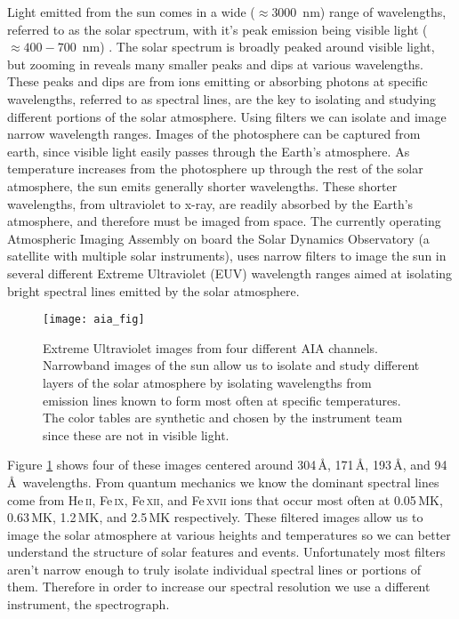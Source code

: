 
Light emitted from the sun comes in a wide ($\approx3000$\, nm) range of wavelengths, referred to as the solar spectrum, with it's peak emission being visible light ($\approx400-700$\, nm) \citep{JudgeBook}.
The solar spectrum is broadly peaked around visible light, but zooming in reveals many smaller peaks and dips at various wavelengths. 
These peaks and dips are from ions emitting or absorbing photons at specific wavelengths, referred to as spectral lines, are the key to isolating and studying different portions of the solar atmosphere.
Using filters we can isolate and image narrow wavelength ranges.
Images of the photosphere can be captured from earth, since visible light easily passes through the Earth's atmosphere.
As temperature increases from the photosphere up through the rest of the solar atmosphere, the sun emits generally shorter wavelengths. 
These shorter wavelengths, from ultraviolet to x-ray, are readily absorbed by the Earth's atmosphere, and therefore must be imaged from space. 
The currently operating Atmospheric Imaging Assembly \citep[AIA:][]{Lemen2012} on board the Solar Dynamics Observatory (a satellite with multiple solar instruments), uses narrow filters to image the sun in several different Extreme Ultraviolet (EUV) wavelength ranges aimed at isolating bright spectral lines emitted by the solar atmosphere.
\begin{figure}
	\texttt{[image: aia\_fig]}
	\caption{Extreme Ultraviolet images from four different AIA channels. Narrowband images of the sun allow us to isolate and study different layers of the solar atmosphere by isolating wavelengths from emission lines known to form most often at specific temperatures. The color tables are synthetic and chosen by the instrument team since these are not in visible light. }
	\label{fig:AIA}
\end{figure}
Figure \ref{fig:AIA} shows four of these images centered around 304\,\AA, 171\,\AA, 193\,\AA, and 94\,\AA\  wavelengths.
From quantum mechanics we know the dominant spectral lines come from He\,\textsc{ii}, Fe\,\textsc{ix}, Fe\,\textsc{xii}, and Fe\,\textsc{xvii}  ions that occur most often at 0.05\,MK, 0.63\,MK, 1.2\,MK, and 2.5\,MK respectively.
These filtered images allow us to image the solar atmosphere at various heights and temperatures so we can better understand the structure of solar features and events.
Unfortunately most filters aren't narrow enough to truly isolate individual spectral lines or portions of them.
Therefore in order to increase our spectral resolution we use a different instrument, the spectrograph.

